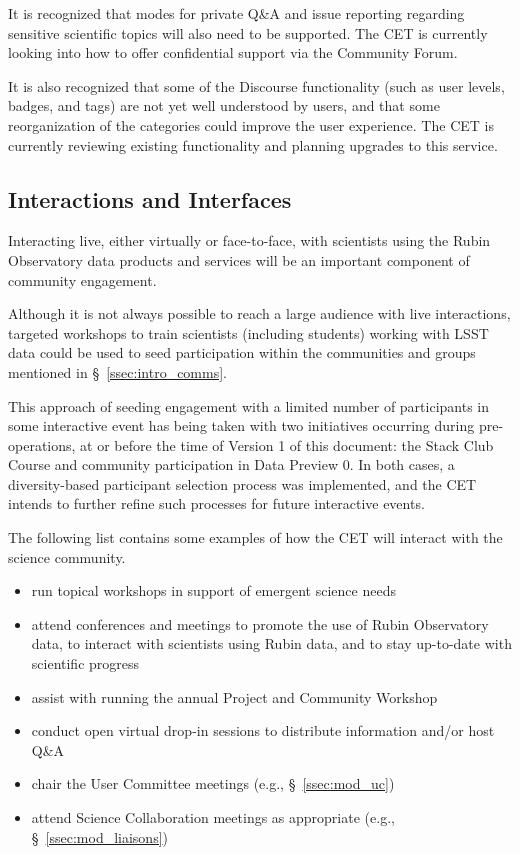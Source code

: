 \documentclass[DM,lsstdraft,toc]{lsstdoc}
\begin{document}
It is recognized that modes for private Q\&A and issue reporting regarding sensitive scientific topics will also need to be supported.
The CET is currently looking into how to offer confidential support via the Community Forum.

It is also recognized that some of the Discourse functionality (such as user levels, badges, and tags) are not yet well understood by users, and that some reorganization of the categories could improve the user experience.
The CET is currently reviewing existing functionality and planning upgrades to this service.


\subsection{Interactions and Interfaces}\label{ssec:mod_interface}

Interacting live, either virtually or face-to-face, with scientists using the Rubin Observatory data products and services will be an important component of community engagement.

Although it is not always possible to reach a large audience with live interactions, targeted workshops to train scientists (including students) working with LSST data could be used to seed participation within the communities and groups mentioned in \S~\ref{ssec:intro_comms}.

This approach of seeding engagement with a limited number of participants in some interactive event has being taken with two initiatives occurring during pre-operations, at or before the time of Version 1 of this document: the Stack Club Course and community participation in Data Preview 0.
In both cases, a diversity-based participant selection process was implemented, and the CET intends to further refine such processes for future interactive events. 

The following list contains some examples of how the CET will interact with the science community.
\begin{itemize}
\item run topical workshops in support of emergent science needs
\item attend conferences and meetings to promote the use of Rubin Observatory data, to interact with scientists using Rubin data, and to stay up-to-date with scientific progress
\item assist with running the annual Project and Community Workshop
\item conduct open virtual drop-in sessions to distribute information and/or host Q\&A 
\item chair the User Committee meetings (e.g., \S~\ref{ssec:mod_uc})
\item attend Science Collaboration meetings as appropriate (e.g., \S~\ref{ssec:mod_liaisons})
\end{itemize}
\end{document}
